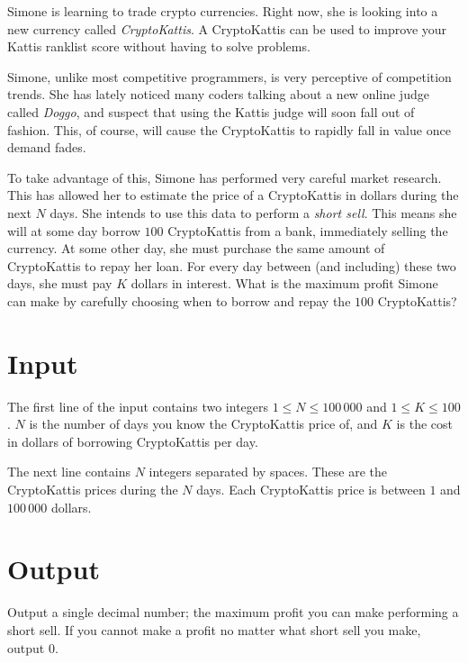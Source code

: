 Simone is learning to trade crypto currencies.
Right now, she is looking into a new currency called \emph{CryptoKattis}.
A CryptoKattis can be used to improve your Kattis ranklist score without having to solve problems.

Simone, unlike most competitive programmers, is very perceptive of competition trends.
She has lately noticed many coders talking about a new online judge called \emph{Doggo}, and suspect that using the Kattis judge will soon fall out of fashion.
This, of course, will cause the CryptoKattis to rapidly fall in value once demand fades.

To take advantage of this, Simone has performed very careful market research.
This has allowed her to estimate the price of a CryptoKattis in dollars during the next $N$ days.
She intends to use this data to perform a \emph{short sell}.
This means she will at some day borrow $100$ CryptoKattis from a bank, immediately selling the currency.
At some other day, she must purchase the same amount of CryptoKattis to repay her loan.
For every day between (and including) these two days, she must pay $K$ dollars in interest.
What is the maximum profit Simone can make by carefully choosing when to borrow and repay the $100$ CryptoKattis?

\section*{Input}
The first line of the input contains two integers $1 \le N \le 100\,000$ and $1 \le K \le 100$.
$N$ is the number of days you know the CryptoKattis price of, and $K$ is the cost in dollars of borrowing CryptoKattis per day.

The next line contains $N$ integers separated by spaces.
These are the CryptoKattis prices during the $N$ days.
Each CryptoKattis price is between $1$ and $100\,000$ dollars.

\section*{Output}
Output a single decimal number; the maximum profit you can make performing a short sell.
If you cannot make a profit no matter what short sell you make, output $0$.
